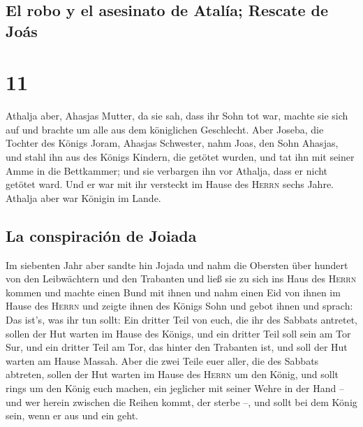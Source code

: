 \hypertarget{el-robo-y-el-asesinato-de-ataluxeda-rescate-de-jouxe1s}{%
\subsection{El robo y el asesinato de Atalía; Rescate de
Joás}\label{el-robo-y-el-asesinato-de-ataluxeda-rescate-de-jouxe1s}}

\hypertarget{section-10}{%
\section{11}\label{section-10}}

 Athalja aber, Ahasjas Mutter, da sie sah, dass ihr Sohn
tot war, machte sie sich auf und brachte um alle aus dem königlichen
Geschlecht.  Aber Joseba, die Tochter des Königs Joram,
Ahasjas Schwester, nahm Joas, den Sohn Ahasjas, und stahl ihn aus des
Königs Kindern, die getötet wurden, und tat ihn mit seiner Amme in die
Bettkammer; und sie verbargen ihn vor Athalja, dass er nicht getötet
ward.  Und er war mit ihr versteckt im Hause des
\textsc{Herrn} sechs Jahre. Athalja aber war Königin im Lande.

\hypertarget{la-conspiraciuxf3n-de-joiada}{%
\subsection{La conspiración de
Joiada}\label{la-conspiraciuxf3n-de-joiada}}

 Im siebenten Jahr aber sandte hin Jojada und nahm die
Obersten über hundert von den Leibwächtern und den Trabanten und ließ
sie zu sich ins Haus des \textsc{Herrn} kommen und machte einen Bund mit
ihnen und nahm einen Eid von ihnen im Hause des \textsc{Herrn} und
zeigte ihnen des Königs Sohn  und gebot ihnen und sprach:
Das ist's, was ihr tun sollt: Ein dritter Teil von euch, die ihr des
Sabbats antretet, sollen der Hut warten im Hause des Königs,
 und ein dritter Teil soll sein am Tor Sur, und ein
dritter Teil am Tor, das hinter den Trabanten ist, und soll der Hut
warten am Hause Massah.  Aber die zwei Teile euer aller,
die des Sabbats abtreten, sollen der Hut warten im Hause des
\textsc{Herrn} um den König,  und sollt rings um den König
euch machen, ein jeglicher mit seiner Wehre in der Hand -- und wer
herein zwischen die Reihen kommt, der sterbe --, und sollt bei dem König
sein, wenn er aus und ein geht.

